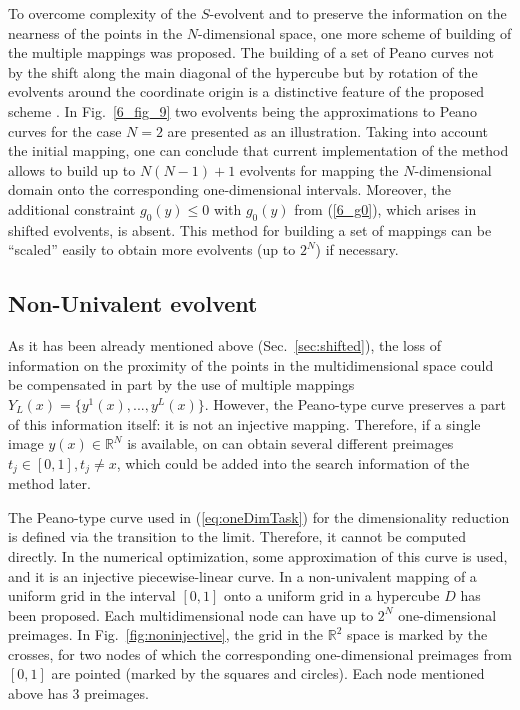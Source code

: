 \documentclass[runningheads]{llncs}
\begin{document}
To overcome complexity of the $S$-evolvent and to preserve the information on the nearness of the points in
the $N$-dimensional space, one more scheme of building of the multiple mappings was proposed.
The building of a set of Peano curves not by the shift along the main diagonal of the hypercube
but by rotation of the evolvents around the coordinate origin is a distinctive feature of the
proposed scheme \cite{Gergel2009}.
In Fig.~\ref{6_fig_9} two evolvents being the approximations to Peano curves for the case
$N=2$ are presented as an illustration.
Taking into account the initial mapping, one can conclude that current implementation of the
method allows to build up to $N(N-1)+1$ evolvents for mapping the $N$-dimensional domain
onto the corresponding one-dimensional intervals. Moreover, the additional constraint  $g_0(y)
\leq 0$ with $g_0(y)$ from (\ref{6_g0}), which arises in shifted evolvents, is absent. This
method for building a set of mappings can be ``scaled'' easily to obtain more evolvents (up to
$2^N$) if necessary.


\subsection{Non-Univalent evolvent}

As it has been already mentioned above (Sec.~\ref{sec:shifted}), the loss of information on the
proximity of the points in the multidimensional space could be compensated in part by the use
of multiple mappings $Y_L(x)=\{y^1(x),...,y^L(x)\}$. However, the Peano-type curve preserves
a part of this information itself: it is not an injective mapping. Therefore, if a single image
$y(x)\in \mathbb{R}^N$ is available, on can obtain several different preimages
$t_j\in[0,1], t_j \not = x$, which could be added into the search information of the method later.

The Peano-type curve used in (\ref{eq:oneDimTask}) for the dimensionality reduction is
defined via the transition to the limit. Therefore, it cannot be computed directly. In the
numerical optimization, some approximation of this curve is used, and it is an injective piecewise-linear curve. In \cite{strongin1978} a non-univalent mapping of a uniform grid in the
interval $[0,1]$ onto a uniform grid in a hypercube $D$ has been proposed. Each
multidimensional node can have up to $2^N$ one-dimensional preimages. In
Fig.~\ref{fig:noninjective}, the grid in the $\mathbb{R}^2$ space is marked by the crosses, for
two nodes of which the corresponding one-dimensional preimages from $[0,1]$ are pointed
(marked by the squares and circles). Each node mentioned above has 3 preimages.
\end{document}
